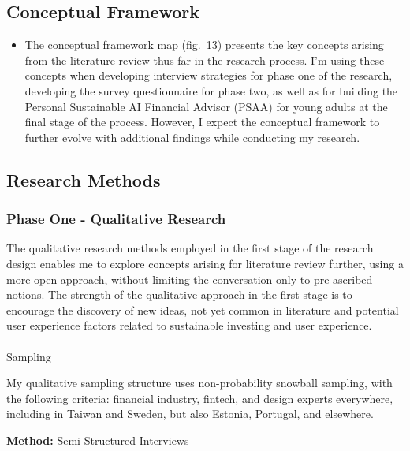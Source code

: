 \documentclass[
  letterpaper,
  DIV=11,
  numbers=noendperiod]{scrartcl}
\makeatletter
\let\oldparagraph\paragraph
\renewcommand{\paragraph}{
    \@ifstar
      \xxxParagraphStar
      \xxxParagraphNoStar
  }
\newcommand{\xxxParagraphStar}[1]{\oldparagraph*{#1}\mbox{}}
\newcommand{\xxxParagraphNoStar}[1]{\oldparagraph{#1}\mbox{}}
\providecommand{\tightlist}{%
  \setlength{\itemsep}{0pt}\setlength{\parskip}{0pt}}\usepackage{longtable,booktabs,array}
\makeatother
\begin{document}
\subsection{Conceptual Framework}\label{conceptual-framework}

\begin{itemize}
\tightlist
\item
  The conceptual framework map (fig.~13) presents the key concepts
  arising from the literature review thus far in the research process.
  I'm using these concepts when developing interview strategies for
  phase one of the research, developing the survey questionnaire for
  phase two, as well as for building the Personal Sustainable AI
  Financial Advisor (PSAA) for young adults at the final stage of the
  process. However, I expect the conceptual framework to further evolve
  with additional findings while conducting my research.
\end{itemize}

\subsection{Research Methods}\label{research-methods}

\subsubsection{Phase One - Qualitative
Research}\label{phase-one---qualitative-research}

The qualitative research methods employed in the first stage of the
research design enables me to explore concepts arising for literature
review further, using a more open approach, without limiting the
conversation only to pre-ascribed notions. The strength of the
qualitative approach in the first stage is to encourage the discovery of
new ideas, not yet common in literature and potential user experience
factors related to sustainable investing and user experience.

\paragraph{Sampling}\label{sampling}

My qualitative sampling structure uses non-probability snowball
sampling, with the following criteria: financial industry, fintech, and
design experts everywhere, including in Taiwan and Sweden, but also
Estonia, Portugal, and elsewhere.

\textbf{Method:} Semi-Structured Interviews
\end{document}
